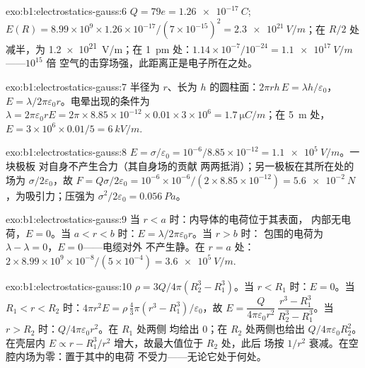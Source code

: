 \begin{solution}{exo:b1:electrostatics-gauss:6}
$Q = 79e = \qty{1.26e-17}{C}$; $E(R) = 8.99 \times 10^9 \times 1.26 \times 10^{-17}/
(7 \times 10^{-15})^2 = \qty{2.3e21}{V/m}$；在 $R/2$ 处减半，为 \qty{1.2e21}{V/m}；在
\qty{1}{pm} 处：$1.14 \times 10^{-7}/10^{-24} = \qty{1.1e17}{V/m}$——$10^{15}$ 倍
空气的击穿场强，此距离正是电子所在之处。
\end{solution}

\begin{solution}{exo:b1:electrostatics-gauss:7}
半径为 $r$、长为 $h$ 的圆柱面：$2\pi rh\,E = \lambda h/\varepsilon_0$，$E =
\lambda/2\pi\varepsilon_0r$。电晕出现的条件为 $\lambda = 2\pi\varepsilon_0 rE = 2\pi \times 8.85 \times
10^{-12} \times 0.01 \times 3 \times 10^6 = \qty{1.7}{\micro C/m}$；在 \qty{5}{m} 处，
$E = 3 \times 10^6 \times 0.01/5 = \qty{6}{kV/m}$.
\end{solution}

\begin{solution}{exo:b1:electrostatics-gauss:8}
$E = \sigma/\varepsilon_0 = 10^{-6}/8.85 \times 10^{-12} = \qty{1.1e5}{V/m}$。一块极板
对自身不产生合力（其自身场的贡献
两两抵消）；另一极板在其所在处的场为 $\sigma/2\varepsilon_0$，故
$F = Q\sigma/2\varepsilon_0 = 10^{-6} \times 10^{-6}/(2 \times 8.85 \times 10^{-12}) =
\qty{5.6e-2}{N}$，为吸引力；压强为 $\sigma^2/2\varepsilon_0 = \qty{0.056}{Pa}$。
\end{solution}

\begin{solution}{exo:b1:electrostatics-gauss:9}
当 $r < a$ 时：内导体的电荷位于其表面，
内部无电荷，$E = 0$。当 $a < r < b$ 时：$E = \lambda/2\pi\varepsilon_0r$。当 $r > b$ 时：
包围的电荷为 $\lambda - \lambda = 0$，$E = 0$——电缆对外
不产生静。在 $r = a$ 处：$2 \times 8.99 \times 10^9 \times 10^{-8}/(5 \times 10^{-4}) =
\qty{3.6e5}{V/m}$.
\end{solution}

\begin{solution}{exo:b1:electrostatics-gauss:10}
$\rho = 3Q/4\pi(R_2^3 - R_1^3)$。当 $r < R_1$ 时：$E = 0$。当 $R_1 < r < R_2$ 时：$4\pi r^2E =
\rho\,\tfrac43\pi(r^3 - R_1^3)/\varepsilon_0$，故 $E = \dfrac{Q}{4\pi\varepsilon_0r^2}\,
\dfrac{r^3 - R_1^3}{R_2^3 - R_1^3}$。当 $r > R_2$ 时：$Q/4\pi\varepsilon_0r^2$。在 $R_1$ 处两侧
均给出 $0$；在 $R_2$ 处两侧也给出 $Q/4\pi\varepsilon_0R_2^2$。在壳层内 $E
\propto r - R_1^3/r^2$ 增大，故最大值位于 $R_2$ 处，此后
场按 $1/r^2$ 衰减。在空腔内场为零：置于其中的电荷
不受力——无论它处于何处。
\end{solution}

